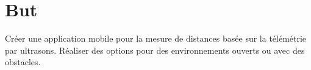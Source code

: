 \section{But}
Créer une application mobile pour la mesure de distances basée sur la télémétrie par ultrasons. Réaliser des options pour des environnements ouverts ou avec des obstacles.